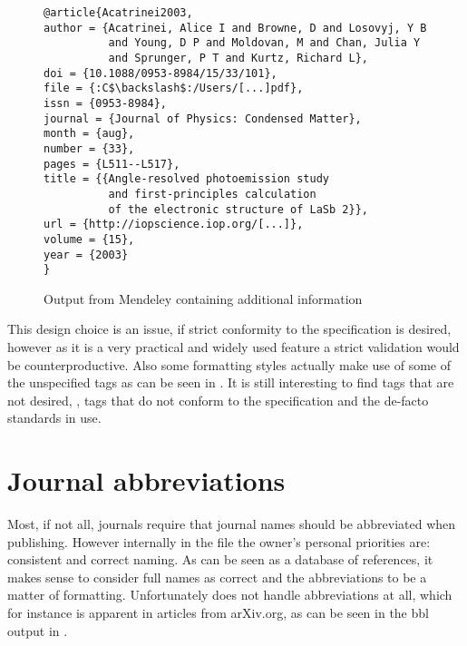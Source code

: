 \begin{figure}
  \centering
\begin{small}
\begin{verbatim}
@article{Acatrinei2003,
author = {Acatrinei, Alice I and Browne, D and Losovyj, Y B
          and Young, D P and Moldovan, M and Chan, Julia Y
          and Sprunger, P T and Kurtz, Richard L},
doi = {10.1088/0953-8984/15/33/101},
file = {:C$\backslash$:/Users/[...]pdf},
issn = {0953-8984},
journal = {Journal of Physics: Condensed Matter},
month = {aug},
number = {33},
pages = {L511--L517},
title = {{Angle-resolved photoemission study
          and first-principles calculation
          of the electronic structure of LaSb 2}},
url = {http://iopscience.iop.org/[...]},
volume = {15},
year = {2003}
}
\end{verbatim}
\end{small}
  \caption{Output from Mendeley containing additional information}
\label{fig:mendeley_output}
\end{figure}

This design choice is an issue, if strict conformity to the
specification is desired, however as it is a very practical and widely
used feature a strict validation would be counterproductive.  Also
some formatting styles actually make use of some of the unspecified
tags as can be seen in . It is still
interesting to find tags that are not desired, \ie, tags that do not
conform to the specification and the de-facto standards in use.


\section{Journal abbreviations}
\label{sec:problems_abbreviations}



Most, if not all, journals require that journal names should be
abbreviated when publishing.  However internally in the {\bibtex} file
the owner's personal priorities are: consistent and correct naming.
As {\bibtex} can be seen as a database of references, it makes sense
to consider full names as correct and the abbreviations to be a matter
of formatting.  Unfortunately {\bibtex} does not handle abbreviations
at all, which for instance is apparent in articles from arXiv.org, as
can be seen in the bbl output in .

